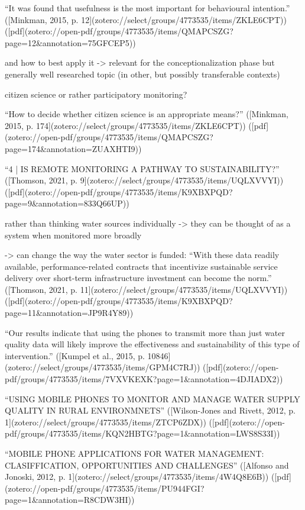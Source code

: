 {“It was found that usefulness is the most important for behavioural intention.” ([Minkman, 2015, p. 12](zotero://select/groups/4773535/items/ZKLE6CPT)) ([pdf](zotero://open-pdf/groups/4773535/items/QMAPCSZG?page=12&annotation=75GFCEP5))

and how to best apply it -> relevant for the conceptionalization phase but generally well researched topic (in other, but possibly transferable contexts)


citizen science or rather participatory monitoring?

“How to decide whether citizen science is an appropriate means?” ([Minkman, 2015, p. 174](zotero://select/groups/4773535/items/ZKLE6CPT)) ([pdf](zotero://open-pdf/groups/4773535/items/QMAPCSZG?page=174&annotation=ZUAXHTI9))

“4 | IS REMOTE MONITORING A PATHWAY TO SUSTAINABILITY?” ([Thomson, 2021, p. 9](zotero://select/groups/4773535/items/UQLXVVYI)) ([pdf](zotero://open-pdf/groups/4773535/items/K9XBXPQD?page=9&annotation=833Q66UP))

rather than thinking water sources individually -> they can be thought of as a system when monitored more broadly

-> can change the way the water sector is funded: “With these data readily available, performance-related contracts that incentivize sustainable service delivery over short-term infrastructure investment can become the norm.” ([Thomson, 2021, p. 11](zotero://select/groups/4773535/items/UQLXVVYI)) ([pdf](zotero://open-pdf/groups/4773535/items/K9XBXPQD?page=11&annotation=JP9R4Y89))

“Our results indicate that using the phones to transmit more than just water quality data will likely improve the effectiveness and sustainability of this type of intervention.” ([Kumpel et al., 2015, p. 10846](zotero://select/groups/4773535/items/GPM4C7RJ)) ([pdf](zotero://open-pdf/groups/4773535/items/7VXVKEXK?page=1&annotation=4DJIADX2))

“USING MOBILE PHONES TO MONITOR AND MANAGE WATER SUPPLY QUALITY IN RURAL ENVIRONMNETS” ([Wilson-Jones and Rivett, 2012, p. 1](zotero://select/groups/4773535/items/ZTCP6ZDX)) ([pdf](zotero://open-pdf/groups/4773535/items/KQN2HBTG?page=1&annotation=LWS8S33I))

“MOBILE PHONE APPLICATIONS FOR WATER MANAGEMENT: CLASIFFICATION, OPPORTUNITIES AND CHALLENGES” ([Alfonso and Jonoski, 2012, p. 1](zotero://select/groups/4773535/items/4W4Q8E6B)) ([pdf](zotero://open-pdf/groups/4773535/items/PU944FGI?page=1&annotation=R8CDW3HI))

}
